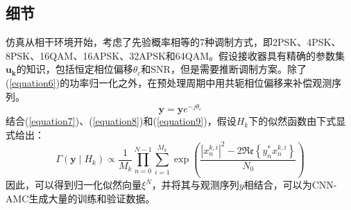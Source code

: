 \documentclass[final]{cvpr}
\begin{document}
\subsection{细节}\label{coherent}

仿真从相干环境开始，考虑了先验概率相等的7种调制方式，即2PSK、4PSK、8PSK、16QAM、16APSK、32APSK和64QAM。假设接收器具有精确的参数集$\mathbf{u_k}$的知识，包括恒定相位偏移$\theta_c$和SNR，但是需要推断调制方案。除了(\ref{equation6})的功率归一化之外，在预处理周期中用共轭相位偏移来补偿观测序列。
\begin{equation}
\mathbf{y}=\mathbf{y} e^{-j \theta_{c}}\label{equation24}
\end{equation}
结合(\ref{equation7})、(\ref{equation8})和(\ref{equation9})，假设$H_k$下的似然函数由下式显式给出：
\begin{equation}
\Gamma\left(\mathbf{y} \mid H_{k}\right) \propto \frac{1}{M_{k}} \prod_{n=0}^{N-1} \sum_{i=1}^{M_{k}} \exp \left(\frac{\left|x_{n}^{k, i}\right|^{2}-2 \Re \mathfrak{e}\left\{y_{n}^{*} x_{n}^{k, i}\right\}}{N_{0}}\right)
\end{equation}
因此，可以得到归一化似然向量$\xi^N$，并将其与观测序列$y$相结合，可以为CNN-AMC生成大量的训练和验证数据。
\end{document}
